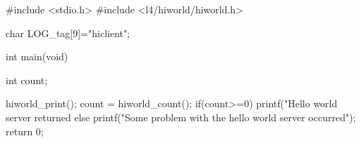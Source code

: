 #include <stdio.h>
#include <l4/hiworld/hiworld.h>

char LOG_tag[9]="hiclient";

int main(void){
  int count;

  hiworld_print();
  count = hiworld_count();
  if(count>=0){
      printf("Hello world server returned %
  } else {
      printf("Some problem with the hello world server occurred\n");
  }
  return 0;
}
